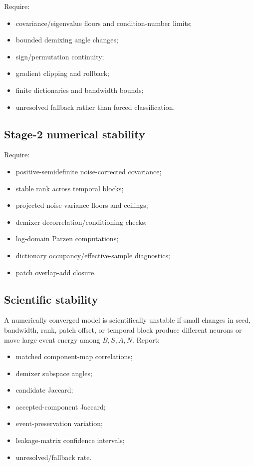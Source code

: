 \documentclass[11pt]{article}
\begin{document}
Require:
\begin{itemize}[leftmargin=*]
\item covariance/eigenvalue floors and condition-number limits;
\item bounded demixing angle changes;
\item sign/permutation continuity;
\item gradient clipping and rollback;
\item finite dictionaries and bandwidth bounds;
\item unresolved fallback rather than forced classification.
\end{itemize}

\subsection{Stage-2 numerical stability}

Require:
\begin{itemize}[leftmargin=*]
\item positive-semidefinite noise-corrected covariance;
\item stable rank across temporal blocks;
\item projected-noise variance floors and ceilings;
\item demixer decorrelation/conditioning checks;
\item log-domain Parzen computations;
\item dictionary occupancy/effective-sample diagnostics;
\item patch overlap-add closure.
\end{itemize}

\subsection{Scientific stability}

A numerically converged model is scientifically unstable if small changes in
seed, bandwidth, rank, patch offset, or temporal block produce different neurons
or move large event energy among $B,S,A,N$. Report:
\begin{itemize}[leftmargin=*]
\item matched component-map correlations;
\item demixer subspace angles;
\item candidate Jaccard;
\item accepted-component Jaccard;
\item event-preservation variation;
\item leakage-matrix confidence intervals;
\item unresolved/fallback rate.
\end{itemize}
\end{document}
